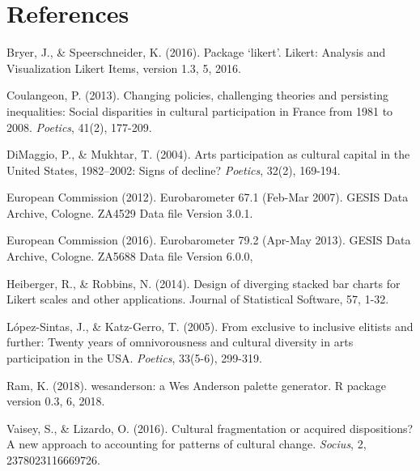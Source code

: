 \documentclass{article}
\begin{document}
\section*{References}
\noindent

Bryer, J., \& Speerschneider, K. (2016). Package ‘likert’. Likert: Analysis and Visualization Likert Items, version 1.3, 5, 2016.

Coulangeon, P. (2013). Changing policies, challenging theories and persisting inequalities: Social disparities in cultural participation in France from 1981 to 2008. \textit{Poetics}, 41(2), 177-209.

DiMaggio, P., \& Mukhtar, T. (2004). Arts participation as cultural capital in the United States, 1982–2002: Signs of decline? \textit{Poetics}, 32(2), 169-194.

European Commission (2012). Eurobarometer 67.1 (Feb-Mar 2007). GESIS Data Archive, Cologne. ZA4529 Data file Version 3.0.1. 

European Commission (2016). Eurobarometer 79.2 (Apr-May 2013). GESIS Data Archive, Cologne. ZA5688 Data file Version 6.0.0, 

Heiberger, R., \& Robbins, N. (2014). Design of diverging stacked bar charts for Likert scales and other applications. Journal of Statistical Software, 57, 1-32.

López-Sintas, J., \& Katz-Gerro, T. (2005). From exclusive to inclusive elitists and further: Twenty years of omnivorousness and cultural diversity in arts participation in the USA. \textit{Poetics}, 33(5-6), 299-319.

Ram, K. (2018). wesanderson: a Wes Anderson palette generator. R package version 0.3, 6, 2018.

Vaisey, S., \& Lizardo, O. (2016). Cultural fragmentation or acquired dispositions? A new approach to accounting for patterns of cultural change. \textit{Socius}, 2, 2378023116669726.
\end{document}
